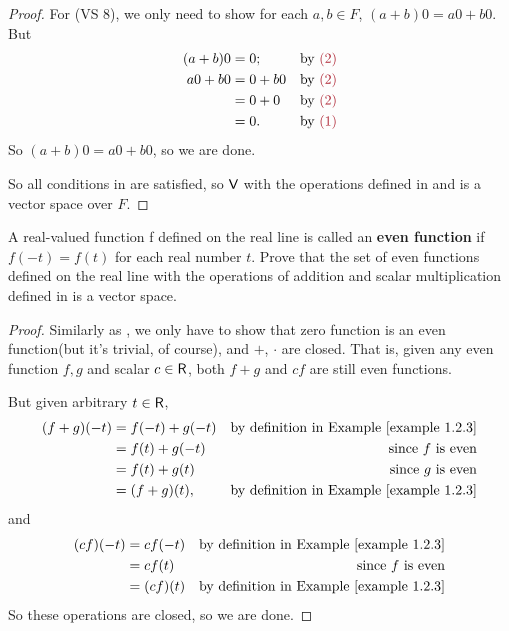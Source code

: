 \begin{proof}
For (VS 8), we only need to show for each \(a, b \in F\), \((a + b)0 = a0 + b0\).
But
\begin{align*}
    (a + b)0 & = 0; & \text{by \MAROON{(2)}} \\
     a0 + b0 & = 0 + b0 & \text{by \MAROON{(2)}} \\
             & = 0 + 0 & \text{by \MAROON{(2)}} \\
             & = 0. & \text{by \MAROON{(1)}}
\end{align*}
So \((a + b)0 = a0 + b0\), so we are done.

So all conditions in  are satisfied, so \(\textsf{V}\) with the operations defined in  and  is a vector space over \(F\).
\end{proof}

\begin{exercise} \label{exercise 1.2.12}
A real-valued function f defined on the real line is called an \textbf{even function} if \(f(-t) = f(t)\) for each real number \(t\).
Prove that the set of even functions defined on the real line with the operations of addition and scalar multiplication defined in  is a vector space.
\end{exercise}

\begin{proof}
Similarly as , we only have to show that zero function is an even function(but it's trivial, of course), and \(+\), \(\cdot\) are closed.
That is, given any even function \(f, g\) and scalar \(c \in \textsf{R}\), both \(f + g\) and \(c f\) are still even functions.

But given arbitrary \(t \in \textsf{R}\),
\begin{align*}
    (f + g)(-t) & = f(-t) + g(-t) & \text{by definition in \EXAMPLE{1.2.3}} \\
                & = f(t) + g(-t) & \text{since \(f\) is even} \\
                & = f(t) + g(t) & \text{since \(g\) is even} \\
                & = (f + g)(t), & \text{by definition in \EXAMPLE{1.2.3}}
\end{align*}
and
\begin{align*}
    (cf)(-t) & = cf(-t) & \text{by definition in \EXAMPLE{1.2.3}} \\
                & = cf(t) & \text{since \(f\) is even} \\
                & = (cf)(t) & \text{by definition in \EXAMPLE{1.2.3}}
\end{align*}
So these operations are closed, so we are done.
\end{proof}

